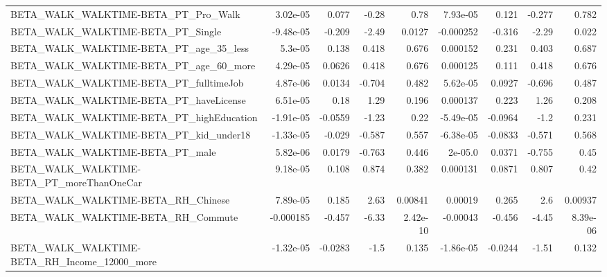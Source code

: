 \begin{tabular}{lrrrrrrrr}
BETA\_WALK\_WALKTIME-BETA\_PT\_Pro\_Walk                &    3.02e-05 &        0.077 &    -0.28 &     0.78 &   7.93e-05 &       0.121 &       -0.277 &         0.782 \\
BETA\_WALK\_WALKTIME-BETA\_PT\_Single                  &   -9.48e-05 &       -0.209 &    -2.49 &   0.0127 &  -0.000252 &      -0.316 &        -2.29 &         0.022 \\
BETA\_WALK\_WALKTIME-BETA\_PT\_age\_35\_less             &     5.3e-05 &        0.138 &    0.418 &    0.676 &   0.000152 &       0.231 &        0.403 &         0.687 \\
BETA\_WALK\_WALKTIME-BETA\_PT\_age\_60\_more             &    4.29e-05 &       0.0626 &    0.418 &    0.676 &   0.000125 &       0.111 &        0.418 &         0.676 \\
BETA\_WALK\_WALKTIME-BETA\_PT\_fulltimeJob             &    4.87e-06 &       0.0134 &   -0.704 &    0.482 &   5.62e-05 &      0.0927 &       -0.696 &         0.487 \\
BETA\_WALK\_WALKTIME-BETA\_PT\_haveLicense             &    6.51e-05 &         0.18 &     1.29 &    0.196 &   0.000137 &       0.223 &         1.26 &         0.208 \\
BETA\_WALK\_WALKTIME-BETA\_PT\_highEducation           &   -1.91e-05 &      -0.0559 &    -1.23 &     0.22 &  -5.49e-05 &     -0.0964 &         -1.2 &         0.231 \\
BETA\_WALK\_WALKTIME-BETA\_PT\_kid\_under18             &   -1.33e-05 &       -0.029 &   -0.587 &    0.557 &  -6.38e-05 &     -0.0833 &       -0.571 &         0.568 \\
BETA\_WALK\_WALKTIME-BETA\_PT\_male                    &    5.82e-06 &       0.0179 &   -0.763 &    0.446 &    2e-05.0 &      0.0371 &       -0.755 &          0.45 \\
BETA\_WALK\_WALKTIME-BETA\_PT\_moreThanOneCar          &    9.18e-05 &        0.108 &    0.874 &    0.382 &   0.000131 &      0.0871 &        0.807 &          0.42 \\
BETA\_WALK\_WALKTIME-BETA\_RH\_Chinese                 &    7.89e-05 &        0.185 &     2.63 &  0.00841 &    0.00019 &       0.265 &          2.6 &       0.00937 \\
BETA\_WALK\_WALKTIME-BETA\_RH\_Commute                 &   -0.000185 &       -0.457 &    -6.33 & 2.42e-10 &   -0.00043 &      -0.456 &        -4.45 &      8.39e-06 \\
BETA\_WALK\_WALKTIME-BETA\_RH\_Income\_12000\_more       &   -1.32e-05 &      -0.0283 &     -1.5 &    0.135 &  -1.86e-05 &     -0.0244 &        -1.51 &         0.132 \\

\end{tabular}
